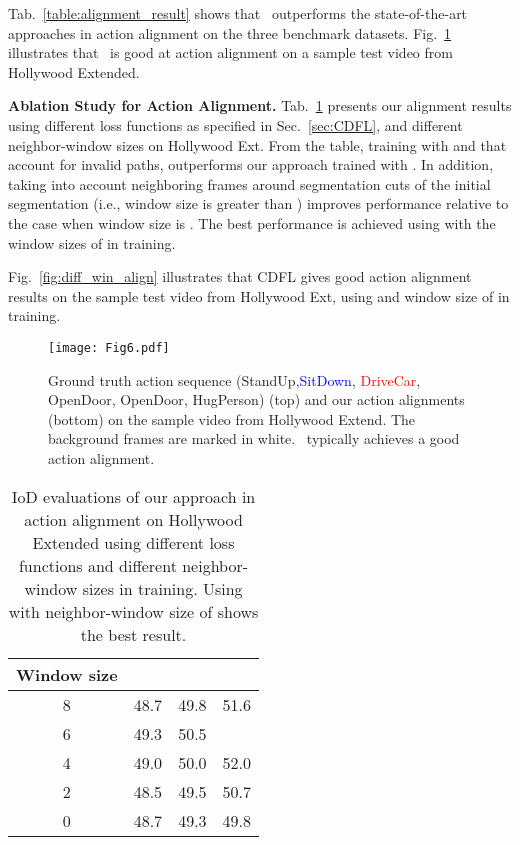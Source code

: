 \documentclass[10pt,twocolumn,letterpaper]{article}
\begin{document}
Tab.~\ref{table:alignment_result} shows that \abbrmodel \ outperforms the state-of-the-art approaches in action alignment on the three benchmark datasets. Fig.~\ref{fig:alignement} illustrates that \abbrmodel \ is good at action alignment on a sample test video from Hollywood Extended.


{\bf  Ablation Study for Action Alignment.} Tab.~\ref{table:Different Training Strategies on alignment} presents our alignment results using different loss functions as specified in Sec.~\ref{sec:CDFL}, and different neighbor-window sizes on Hollywood Ext. From the table, training with  and  that account for invalid paths, outperforms our approach trained with . In addition, taking into account neighboring frames around segmentation cuts of the initial segmentation (i.e., window size is greater than ) improves performance relative to the case when window size is . The best performance is achieved using  with the window sizes of  in training. 

Fig.~\ref{fig:diff_win_align} illustrates that CDFL gives good action alignment results on the sample test video from Hollywood Ext, using  and window size of  in training.

\begin{figure}[!tp]
\centering
\texttt{[image: Fig6.pdf]}
\caption{Ground truth action sequence (\textcolor{mypink}{StandUp},\textcolor{blue}{SitDown}, \textcolor{red}{DriveCar}, \textcolor{mygreen}{OpenDoor}, \textcolor{mygreen}{OpenDoor}, \textcolor{myyellow}{HugPerson}) (top) and our action alignments (bottom) on the sample video  from Hollywood Extend. The background frames are marked in white. \abbrmodel\ typically achieves a good action alignment.}
\label{fig:alignement}
\end{figure}

\begin{table}
\begin{center}
\begin{tabular}{|c|c|c|c|}
\hline  Window size &  & & \\
\hline 8 & 48.7 & 49.8 & 51.6\\
\hline 6 & 49.3 & 50.5 & \\
\hline 4 & 49.0 & 50.0 & 52.0\\
\hline 2 & 48.5 & 49.5 & 50.7\\
\hline 0 & 48.7 & 49.3 & 49.8\\
\hline
\end{tabular}
\end{center}
\caption{IoD evaluations of our approach in action alignment on Hollywood Extended using different loss functions and different neighbor-window sizes in training. Using \abbrmodel{} with neighbor-window size of  shows the best result.}
\label{table:Different Training Strategies on alignment}
\end{table}
\end{document}
